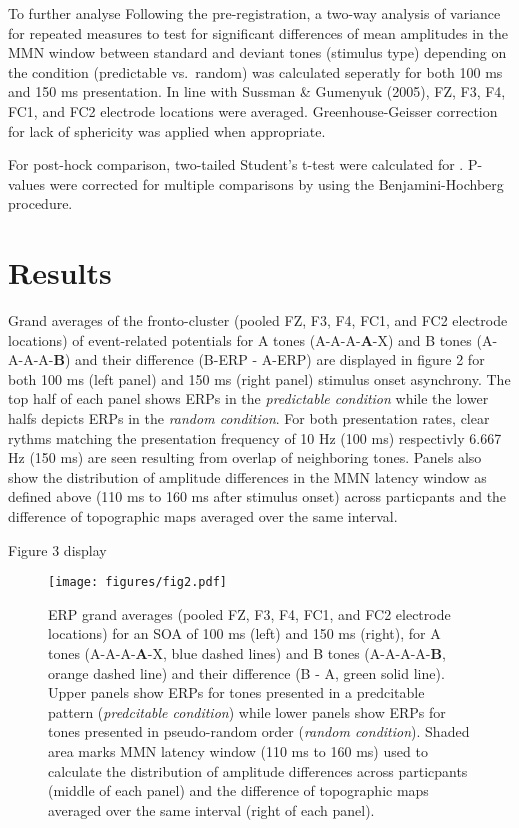 \documentclass[stu,a4paper,11pt,floatsintext]{apa7}
\renewcommand{\includegraphics}[1]{
	\latexincludegraphics[width = \textwidth]{#1}
}
\begin{document}
To further analyse Following the pre-registration, a two-way analysis of
variance for repeated measures to test for significant differences of
mean amplitudes in the MMN window between standard and deviant tones
(stimulus type) depending on the condition (predictable vs.~random) was
calculated seperatly for both 100 ms and 150 ms presentation. In line
with Sussman \& Gumenyuk (2005), FZ, F3, F4, FC1, and FC2 electrode
locations were averaged. Greenhouse-Geisser correction for lack of
sphericity was applied when appropriate.

For post-hock comparison, two-tailed Student's t-test were calculated
for . P-values were corrected for multiple comparisons by using the
Benjamini-Hochberg procedure.

\hypertarget{results}{%
\section{Results}\label{results}}

Grand averages of the fronto-cluster (pooled FZ, F3, F4, FC1, and FC2
electrode locations) of event-related potentials for A tones
(A-A-A-\textbf{A}-X) and B tones (A-A-A-A-\textbf{B}) and their
difference (B-ERP - A-ERP) are displayed in figure 2 for both 100 ms
(left panel) and 150 ms (right panel) stimulus onset asynchrony. The top
half of each panel shows ERPs in the \emph{predictable condition} while
the lower halfs depicts ERPs in the \emph{random condition}. For both
presentation rates, clear rythms matching the presentation frequency of
10 Hz (100 ms) respectivly 6.667 Hz (150 ms) are seen resulting from
overlap of neighboring tones. Panels also show the distribution of
amplitude differences in the MMN latency window as defined above (110 ms
to 160 ms after stimulus onset) across particpants and the difference of
topographic maps averaged over the same interval.

Figure 3 display

\begin{figure}
\centering
\texttt{[image: figures/fig2.pdf]}
\caption{ERP grand averages (pooled FZ, F3, F4, FC1, and FC2 electrode
locations) for an SOA of 100 ms (left) and 150 ms (right), for A tones
(A-A-A-\textbf{A}-X, blue dashed lines) and B tones (A-A-A-A-\textbf{B},
orange dashed line) and their difference (B - A, green solid line).
Upper panels show ERPs for tones presented in a predcitable pattern
(\emph{predcitable condition}) while lower panels show ERPs for tones
presented in pseudo-random order (\emph{random condition}). Shaded area
marks MMN latency window (110 ms to 160 ms) used to calculate the
distribution of amplitude differences across particpants (middle of each
panel) and the difference of topographic maps averaged over the same
interval (right of each panel).}
\end{figure}
\end{document}
